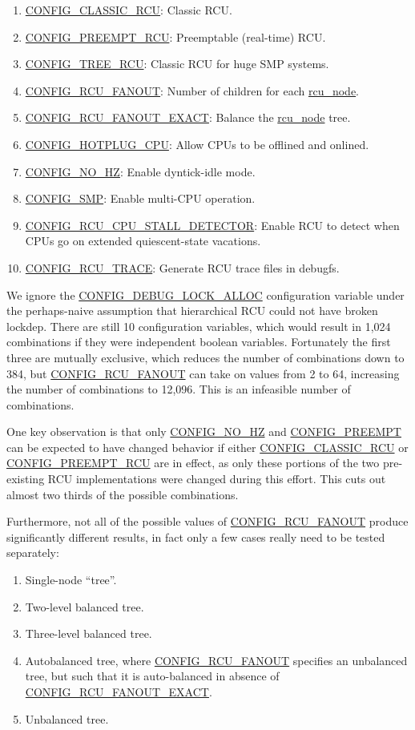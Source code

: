 \begin{enumerate}
\item    \url{CONFIG_CLASSIC_RCU}: Classic RCU.
\item    \url{CONFIG_PREEMPT_RCU}: Preemptable (real-time) RCU.
\item    \url{CONFIG_TREE_RCU}: Classic RCU for huge SMP systems.
\item    \url{CONFIG_RCU_FANOUT}: Number of children for each
		\url{rcu_node}.
\item    \url{CONFIG_RCU_FANOUT_EXACT}: Balance the
		\url{rcu_node} tree.
\item    \url{CONFIG_HOTPLUG_CPU}: Allow CPUs to be offlined
		and onlined.
\item    \url{CONFIG_NO_HZ}: Enable dyntick-idle mode.
\item    \url{CONFIG_SMP}: Enable multi-CPU operation.
\item    \url{CONFIG_RCU_CPU_STALL_DETECTOR}: Enable RCU to detect
		when CPUs go on extended quiescent-state vacations.
\item    \url{CONFIG_RCU_TRACE}: Generate RCU trace files in debugfs.
\end{enumerate}

We ignore the \url{CONFIG_DEBUG_LOCK_ALLOC} configuration
variable under the perhaps-naive assumption that hierarchical RCU
could not have broken lockdep.
There are still 10 configuration variables, which would result in
1,024 combinations if they were independent boolean variables.
Fortunately the first three are mutually exclusive, which reduces
the number of combinations down to 384, but \url{CONFIG_RCU_FANOUT}
can take on values from 2 to 64, increasing the number of combinations
to 12,096.
This is an infeasible number of combinations.

One key observation is that only \url{CONFIG_NO_HZ}
and \url{CONFIG_PREEMPT} can be expected to have changed behavior
if either \url{CONFIG_CLASSIC_RCU} or
\url{CONFIG_PREEMPT_RCU} are in effect, as only these portions
of the two pre-existing RCU implementations were changed during this effort.
This cuts out almost two thirds of the possible combinations.

Furthermore, not all of the possible values of
\url{CONFIG_RCU_FANOUT} produce significantly different results,
in fact only a few cases really need to be tested separately:

\begin{enumerate}
\item	Single-node ``tree''.
\item	Two-level balanced tree.
\item	Three-level balanced tree.
\item	Autobalanced tree, where \url{CONFIG_RCU_FANOUT}
	specifies an unbalanced tree, but such that it is auto-balanced
	in absence of \url{CONFIG_RCU_FANOUT_EXACT}.
\item	Unbalanced tree.
\end{enumerate}

